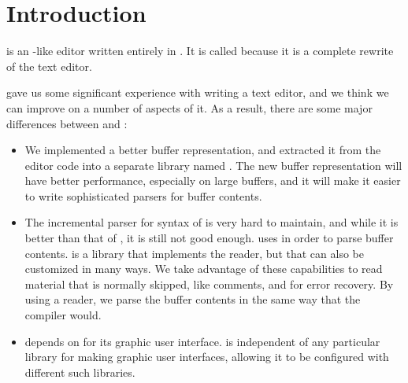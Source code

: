 \chapter{Introduction}

\sysname{} is an \emacs{}-like editor written entirely in
\commonlisp{}.  It is called \sysname{} because it is a complete
rewrite of the \climacs{} text editor.

\climacs{} gave us some significant experience with writing a text
editor, and we think we can improve on a number of aspects of it.  As
a result, there are some major differences between \climacs{} and
\sysname{}:

\begin{itemize}
\item We implemented a better buffer representation, and extracted it
  from the editor code into a separate library named \cluffer{}.  The
  new buffer representation will have better performance, especially
  on large buffers, and it will make it easier to write sophisticated
  parsers for buffer contents.
\item The incremental parser for \commonlisp{} syntax of \climacs{} is
  very hard to maintain, and while it is better than that of \emacs{},
  it is still not good enough.  \sysname{} uses \eclector{} in order
  to parse buffer contents.  \eclector{} is a library that implements
  the \commonlisp{} reader, but that can also be customized in many
  ways.  We take advantage of these capabilities to read material that
  is normally skipped, like comments, and for error recovery.  By
  using a \commonlisp{} reader, we parse the buffer contents in the
  same way that the \commonlisp{} compiler would.
\item \climacs{} depends on \mcclim{} for its graphic user interface.
  \sysname{} is independent of any particular library for making
  graphic user interfaces, allowing it to be configured with different
  such libraries.
\end{itemize}
